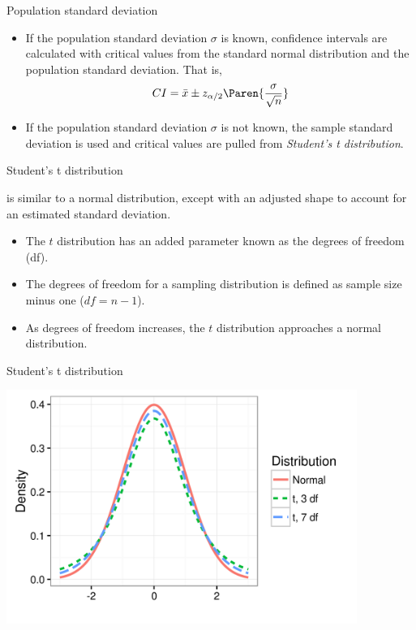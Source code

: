 \documentclass[xcolor=table]{beamer}
\begin{document}
\begin{frame}{Population standard deviation}
\begin{block}{}
\large
\begin{itemize}
\item If the population standard deviation $\sigma$ is known, confidence intervals are calculated with critical values from the standard normal distribution and the population standard deviation. That is,
\[CI = \bar x \pm z_{\alpha/2} \Paren{\frac \sigma {\sqrt{n}}}\] 
\pause\item If the population standard deviation $\sigma$ is not known, the sample standard deviation is used and critical values are pulled from \emph{Student's t distribution}.
\end{itemize}
\end{block}
\end{frame}

\begin{frame}{Student's t distribution}
\begin{block}{}
\large
{} is similar to a normal distribution, except with an adjusted shape to account for an estimated standard deviation.\\
\begin{itemize}
\pause\item The $t$ distribution has an added parameter known as the degrees of freedom (df).
\pause\item The degrees of freedom for a sampling distribution is defined as sample size minus one ($df = n-1$).
\pause\item As degrees of freedom increases, the $t$ distribution approaches a normal distribution.
\end{itemize} 
\end{block}
\end{frame}

\begin{frame}{Student's t distribution}
\medskip
{\centering
\includegraphics[width=4.5in]{../images/ch7_t_dist}
\par}
\end{frame}
\end{document}
